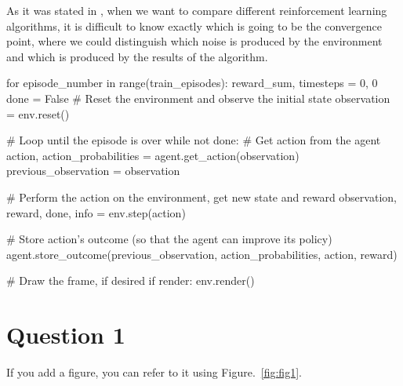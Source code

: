 \documentclass[12pt]{article}
\begin{document}
As it was stated in \cite{nagendra2017comparison}, when we want to compare different reinforcement learning algorithms, it is difficult to know exactly which is going to be the convergence point, where we could distinguish which noise is produced by the environment and which is produced by the results of the algorithm.


\begin{pycode}
for episode_number in range(train_episodes):
    reward_sum, timesteps = 0, 0
    done = False
    # Reset the environment and observe the initial state
    observation = env.reset()

    # Loop until the episode is over
    while not done:
        # Get action from the agent
        action, action_probabilities = agent.get_action(observation)
        previous_observation = observation

        # Perform the action on the environment, get new state and reward
        observation, reward, done, info = env.step(action)

        # Store action's outcome (so that the agent can improve its policy)
        agent.store_outcome(previous_observation, action_probabilities, action, reward)

        # Draw the frame, if desired
        if render:
            env.render()
\end{pycode}

\section{Question 1}

If you add a figure, you can refer to it using Figure.~\ref*{fig:fig1}.



\end{document}
